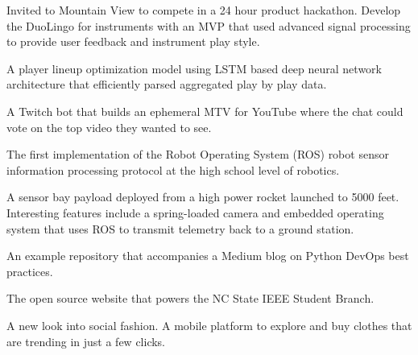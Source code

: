 {%
	Invited to Mountain View to compete in a 24 hour product hackathon. Develop the DuoLingo for instruments with an MVP that used advanced signal processing to provide user feedback and instrument play style.
}

\vspace{0.5em}

{%
	A player lineup optimization model using LSTM based deep neural network architecture that efficiently parsed aggregated play by play data.
}

\vspace{0.5em}

{%
	A Twitch bot that builds an ephemeral MTV for YouTube where the chat could vote on the top video they wanted to see.
}

\vspace{0.5em}

{%
	The first implementation of the Robot Operating System (ROS) robot sensor information processing protocol at the high school level of robotics.
}

\vspace{0.5em}

{%
	A sensor bay payload deployed from a high power rocket launched to 5000 feet. Interesting features include a spring-loaded camera and embedded operating system that uses ROS to transmit telemetry back to a ground station.
}

\vspace{0.5em}

{%
	An example repository that accompanies a Medium blog on Python DevOps best practices.
}

\vspace{0.5em}

{%
	The open source website that powers the NC State IEEE Student Branch.
}

\vspace{0.5em}

{%
	A new look into social fashion. A mobile platform to explore and buy clothes that are trending in just a few clicks.
}

